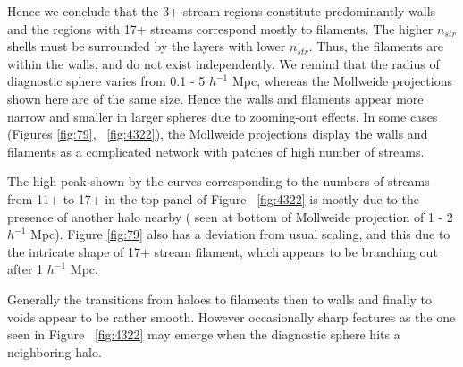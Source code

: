Hence we conclude that the 3+ stream regions constitute predominantly walls and the regions with 17+ streams correspond mostly to filaments. The higher $n_{str}$ shells must be surrounded by the layers with lower $n_{str}$. Thus, the filaments are within the walls, and do not exist independently.  
We remind that the radius of diagnostic sphere varies from 0.1 - 5 $h^{-1}$ Mpc, whereas the Mollweide projections shown here are of the same size. Hence the walls and filaments appear more narrow and smaller in larger spheres due to zooming-out effects. 
 In some cases (Figures \ref{fig:79}, ~\ref{fig:4322}), the Mollweide projections display the walls  and filaments as a complicated network 
 with patches of high number of streams. 

The high peak shown by the curves corresponding to the numbers of streams from 11+ to 17+  in the top panel of Figure ~\ref{fig:4322}
is mostly due to the presence of another halo nearby ( seen at bottom of Mollweide projection of 1 - 2 $h^{-1}$ Mpc). Figure \ref{fig:79} also has a deviation from usual scaling, and this due to the intricate shape of 17+ stream filament, which appears to be branching out after 1 $h^{-1}$ Mpc. 

Generally the transitions from haloes to filaments then to walls and finally to voids appear to be rather smooth.
However occasionally sharp features as the one seen in Figure ~\ref{fig:4322} may emerge when the diagnostic sphere hits a neighboring halo.

 
